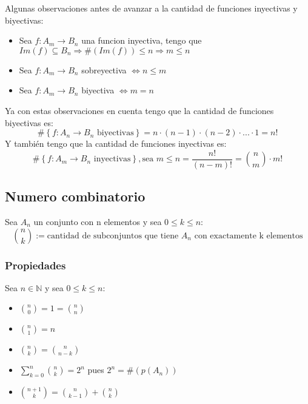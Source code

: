\documentclass{report}
\newcommand{\card}[1]{\##1}
\begin{document}
Algunas observaciones antes de avanzar a la cantidad de funciones inyectivas y biyectivas: \begin{itemize}
    \item Sea $f: A_m \rightarrow B_n$ una funcion inyectiva, tengo que $Im(f) \subseteq B_n \Rightarrow \card{(Im(f))} \leq n \Rightarrow m \leq n$
    \item Sea $f: A_m \rightarrow B_n$ sobreyectiva $\iff n \leq m$
    \item Sea $f: A_m \rightarrow B_n$ biyectiva $\iff m = n$
\end{itemize}
Ya con estas observaciones en cuenta tengo que la cantidad de funciones biyectivas es: \begin{equation}
    \card{\left\{f: A_n \rightarrow B_n \text{ biyectivas}\right\}} = n \cdot (n-1) \cdot (n-2) \cdot ... \cdot 1 = n!
\end{equation}
Y también tengo que la cantidad de funciones inyectivas es: \begin{equation}
    \card{\left\{f: A_m \rightarrow B_n \text{ inyectivas}\right\}}, \text{sea $m \leq n$} = \frac{n!}{(n-m)!} = \binom{n}{m} \cdot m!
\end{equation}

\subsection{Numero combinatorio}
Sea $A_n$ un conjunto con n elementos y sea $0 \leq k \leq n$: \begin{equation}
    \binom{n}{k}:= \text{cantidad de subconjuntos que tiene $A_n$ con exactamente k elementos}
\end{equation}

\subsubsection{Propiedades}
Sea $n \in \mathbb{N}$ y sea $0 \leq k \leq n$: \begin{itemize}
    \item $\binom{n}{0} = 1 = \binom{n}{n}$
    \item $\binom{n}{1} = n$
    \item $\binom{n}{k} = \binom{n}{n-k}$
    \item $\sum_{k=0}^n \binom{n}{k} = 2^n$ pues $2^n = \card{(p(A_n))}$
    \item $\binom{n+1}{k} = \binom{n}{k-1} + \binom{n}{k}$
\end{itemize}
\end{document}
